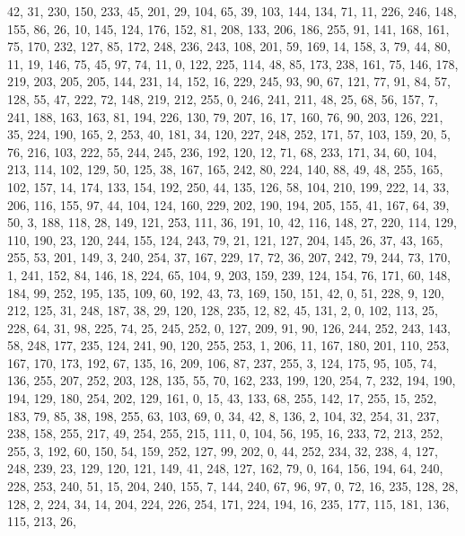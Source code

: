 \begin{DoxyCode}
       42, 31, 230, 150, 233, 45, 201, 29, 104, 65, 39, 103, 144, 134, 71, 11, 226, 246, 148, 155, 86, 26, 10, 145,
       124, 176, 152, 81, 208, 133, 206, 186, 255, 91, 141, 168, 161, 75, 170, 232, 127, 85, 172, 248, 236, 243,
       108, 201, 59, 169, 14, 158, 3, 79, 44, 80, 11, 19, 146, 75, 45, 97, 74, 11, 0, 122, 225, 114, 48, 85, 173,
       238, 161, 75, 146, 178, 219, 203, 205, 205, 144, 231, 14, 152, 16, 229, 245, 93, 90, 67, 121, 77, 91, 84, 57,
       128, 55, 47, 222, 72, 148, 219, 212, 255, 0, 246, 241, 211, 48, 25, 68, 56, 157, 7, 241, 188, 163, 163, 81,
       194, 226, 130, 79, 207, 16, 17, 160, 76, 90, 203, 126, 221, 35, 224, 190, 165, 2, 253, 40, 181, 34, 120, 227,
       248, 252, 171, 57, 103, 159, 20, 5, 76, 216, 103, 222, 55, 244, 245, 236, 192, 120, 12, 71, 68, 233, 171,
       34, 60, 104, 213, 114, 102, 129, 50, 125, 38, 167, 165, 242, 80, 224, 140, 88, 49, 48, 255, 165, 102, 157,
       14, 174, 133, 154, 192, 250, 44, 135, 126, 58, 104, 210, 199, 222, 14, 33, 206, 116, 155, 97, 44, 104, 124,
       160, 229, 202, 190, 194, 205, 155, 41, 167, 64, 39, 50, 3, 188, 118, 28, 149, 121, 253, 111, 36, 191, 10, 42,
       116, 148, 27, 220, 114, 129, 110, 190, 23, 120, 244, 155, 124, 243, 79, 21, 121, 127, 204, 145, 26, 37, 43,
       165, 255, 53, 201, 149, 3, 240, 254, 37, 167, 229, 17, 72, 36, 207, 242, 79, 244, 73, 170, 1, 241, 152, 84,
       146, 18, 224, 65, 104, 9, 203, 159, 239, 124, 154, 76, 171, 60, 148, 184, 99, 252, 195, 135, 109, 60, 192,
       43, 73, 169, 150, 151, 42, 0, 51, 228, 9, 120, 212, 125, 31, 248, 187, 38, 29, 120, 128, 235, 12, 82, 45,
       131, 2, 0, 102, 113, 25, 228, 64, 31, 98, 225, 74, 25, 245, 252, 0, 127, 209, 91, 90, 126, 244, 252, 243, 143,
       58, 248, 177, 235, 124, 241, 90, 120, 255, 253, 1, 206, 11, 167, 180, 201, 110, 253, 167, 170, 173, 192, 67,
       135, 16, 209, 106, 87, 237, 255, 3, 124, 175, 95, 105, 74, 136, 255, 207, 252, 203, 128, 135, 55, 70, 162,
       233, 199, 120, 254, 7, 232, 194, 190, 194, 129, 180, 254, 202, 129, 161, 0, 15, 43, 133, 68, 255, 142, 17,
       255, 15, 252, 183, 79, 85, 38, 198, 255, 63, 103, 69, 0, 34, 42, 8, 136, 2, 104, 32, 254, 31, 237, 238, 158,
       255, 217, 49, 254, 255, 215, 111, 0, 104, 56, 195, 16, 233, 72, 213, 252, 255, 3, 192, 60, 150, 54, 159,
       252, 127, 99, 202, 0, 44, 252, 234, 32, 238, 4, 127, 248, 239, 23, 129, 120, 121, 149, 41, 248, 127, 162, 79,
       0, 164, 156, 194, 64, 240, 228, 253, 240, 51, 15, 204, 240, 155, 7, 144, 240, 67, 96, 97, 0, 72, 16, 235,
       128, 28, 128, 2, 224, 34, 14, 204, 224, 226, 254, 171, 224, 194, 16, 235, 177, 115, 181, 136, 115, 213, 26,

\end{DoxyCode}
